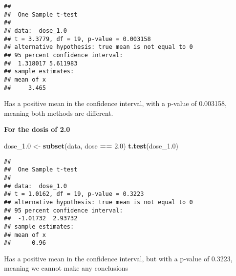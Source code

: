 \documentclass[
]{article}
\newenvironment{Shaded}{\begin{snugshade}}{\end{snugshade}}
\newcommand{\FloatTok}[1]{\textcolor[rgb]{0.00,0.00,0.81}{#1}}
\newcommand{\KeywordTok}[1]{\textcolor[rgb]{0.13,0.29,0.53}{\textbf{#1}}}
\newcommand{\NormalTok}[1]{#1}
\newcommand{\OperatorTok}[1]{\textcolor[rgb]{0.81,0.36,0.00}{\textbf{#1}}}
\newcommand{\StringTok}[1]{\textcolor[rgb]{0.31,0.60,0.02}{#1}}
\begin{document}
\begin{verbatim}
## 
##  One Sample t-test
## 
## data:  dose_1.0
## t = 3.3779, df = 19, p-value = 0.003158
## alternative hypothesis: true mean is not equal to 0
## 95 percent confidence interval:
##  1.318017 5.611983
## sample estimates:
## mean of x 
##     3.465
\end{verbatim}

Has a positive mean in the confidence interval, with a p-value of
0.003158, meaning both methods are different.

\textbf{For the dosis of 2.0}

\begin{Shaded}
\begin{Highlighting}[]
\NormalTok{dose_}\FloatTok{1.0}\NormalTok{ <-}\StringTok{ }\KeywordTok{subset}\NormalTok{(data, dose }\OperatorTok{==}\StringTok{ }\FloatTok{2.0}\NormalTok{)}
\KeywordTok{t.test}\NormalTok{(dose_}\FloatTok{1.0}\NormalTok{)}
\end{Highlighting}
\end{Shaded}

\begin{verbatim}
## 
##  One Sample t-test
## 
## data:  dose_1.0
## t = 1.0162, df = 19, p-value = 0.3223
## alternative hypothesis: true mean is not equal to 0
## 95 percent confidence interval:
##  -1.01732  2.93732
## sample estimates:
## mean of x 
##      0.96
\end{verbatim}

Has a positive mean in the confidence interval, but with a p-value of
0.3223, meaning we cannot make any conclusions
\end{document}
